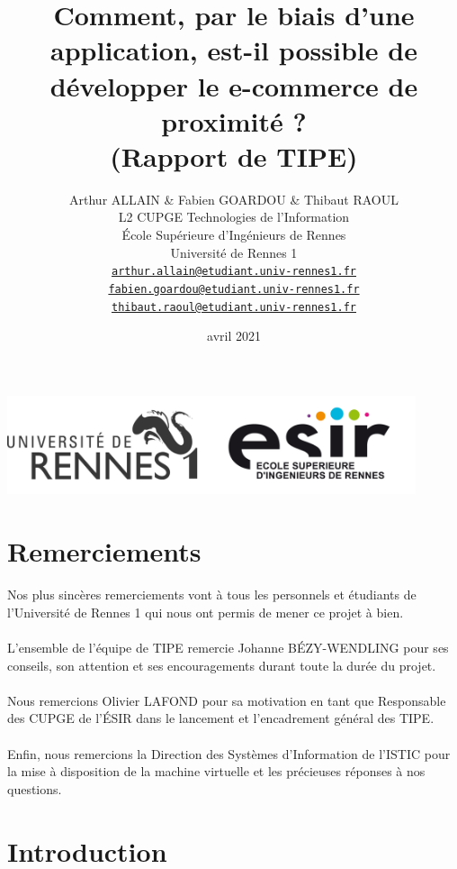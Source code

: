 \documentclass[a4paper, 12pt]{article}
\author{ \vspace{1cm} Arthur ALLAIN \& Fabien GOARDOU \& Thibaut RAOUL\\ 
		L2 CUPGE Technologies de l'Information\\
		École Supérieure d'Ingénieurs de Rennes\\ \vspace{1cm}
		Université de Rennes 1\\ 
		\texttt{\href{mailto:arthur.allain@etudiant.univ-rennes1.fr}{arthur.allain@etudiant.univ-rennes1.fr}}\\
		\texttt{\href{mailto:fabien.goardou@etudiant.univ-rennes1.fr}{fabien.goardou@etudiant.univ-rennes1.fr}}\\
		\texttt{\href{mailto:thibaut.raoul@etudiant.univ-rennes1.fr}{thibaut.raoul@etudiant.univ-rennes1.fr}}}
\title{{\textbf{Comment, par le biais d’une application, est-il possible de développer le e-commerce de proximité ?}\\(Rapport de TIPE)}}
\date{avril 2021}
\begin{document}
\maketitle
\begin{center}
	\includegraphics[width=12cm]{fig/banniere_logos}
\end{center}
\thispagestyle{empty}
\newpage
\tableofcontents
\newpage
\listoffigures
\newpage
\section*{Remerciements}
\paragraph{}Nos plus sincères remerciements vont à tous les personnels et étudiants de l'Université de Rennes 1 qui nous ont permis de mener ce projet à bien.

\paragraph{}L'ensemble de l'équipe de TIPE remercie Johanne BÉZY-WENDLING pour ses conseils, son attention et ses encouragements durant toute la durée du projet.

\paragraph{}Nous remercions Olivier LAFOND pour sa motivation en tant que Responsable des CUPGE de l'ÉSIR dans le lancement et l'encadrement général des TIPE.

\paragraph{}Enfin, nous remercions la Direction des Systèmes d'Information de l'ISTIC pour la mise à disposition de la machine virtuelle et les précieuses réponses à nos questions. 

\newpage

\section{Introduction}
\end{document}
